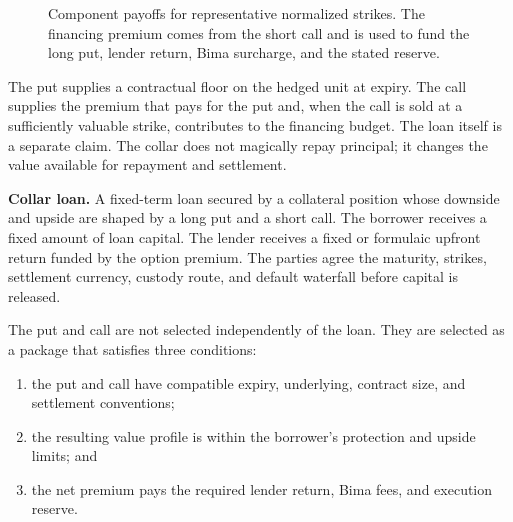 \documentclass[11pt,oneside]{article}
\begin{document}
\begin{figure}[htbp]
\centering
{}
\caption{Component payoffs for representative normalized strikes. The financing premium comes from the short call and is used to fund the long put, lender return, Bima surcharge, and the stated reserve.}
\label{fig:collar-components}
\end{figure}

The put supplies a contractual floor on the hedged unit at expiry. The call supplies the premium that pays for the put and, when the call is sold at a sufficiently valuable strike, contributes to the financing budget. The loan itself is a separate claim. The collar does not magically repay principal; it changes the value available for repayment and settlement.

\begin{definitionbox}
\textbf{Collar loan.} A fixed-term loan secured by a collateral position whose downside and upside are shaped by a long put and a short call. The borrower receives a fixed amount of loan capital. The lender receives a fixed or formulaic upfront return funded by the option premium. The parties agree the maturity, strikes, settlement currency, custody route, and default waterfall before capital is released.
\end{definitionbox}

The put and call are not selected independently of the loan. They are selected as a package that satisfies three conditions:

\begin{enumerate}
\item the put and call have compatible expiry, underlying, contract size, and settlement conventions;
\item the resulting value profile is within the borrower's protection and upside limits; and
\item the net premium pays the required lender return, Bima fees, and execution reserve.
\end{enumerate}
\end{document}
